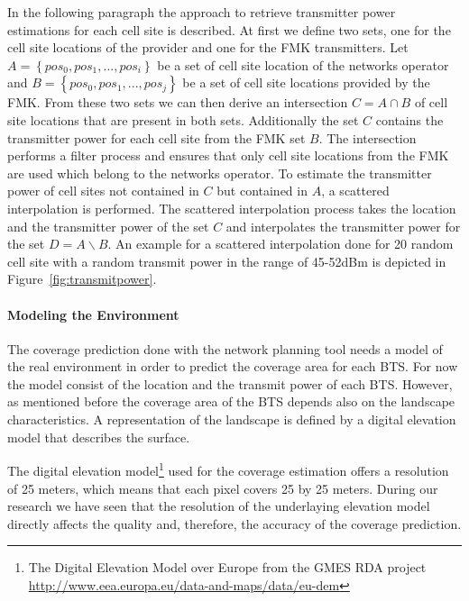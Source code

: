 \documentclass[twocolumn]{bmcart}%
\begin{document}
In the following paragraph the approach to retrieve transmitter power estimations for each cell site is described. At first we define two sets, one for the cell site locations of the provider and one for the FMK transmitters.
Let $A=\left\lbrace pos_0,pos_1,...,pos_i \right\rbrace $ be a set of cell site location of the networks operator and $B=\left\lbrace pos_0,pos_1,...,pos_j \right\rbrace$ be a set of cell site locations provided by the FMK. From these two sets we can then derive an intersection $C=A \cap B$ of cell site locations that are present in both sets. Additionally the set $C$ contains the transmitter power for each cell site from the FMK set $B$. The intersection performs a filter process and ensures that only cell site locations from the FMK are used which belong to the networks operator. To estimate the transmitter power of cell sites not contained in $C$ but  contained in $A$, a scattered interpolation is performed. The scattered interpolation process takes the location and the transmitter power of the set $C$ and interpolates the transmitter power for the set $D=A \backslash B$.
An example for a scattered interpolation done for 20 random cell site with a random transmit power in the range of 45-52dBm is depicted in Figure~\ref{fig:transmitpower}.

\paragraph{Modeling the Environment}
The coverage prediction done with the network planning tool needs a model of the real environment in order to predict the coverage area for each BTS. For now the model consist of the location and the transmit power of each BTS. However, as mentioned before the coverage area of the BTS depends also on the landscape characteristics. A representation of the landscape is defined by a digital elevation model that describes the surface. 

The digital elevation model\footnote{The Digital Elevation Model over Europe from the GMES RDA project \url{http://www.eea.europa.eu/data-and-maps/data/eu-dem}} used for the coverage estimation offers a resolution of 25 meters, which means that each pixel covers 25 by 25 meters. During our research we have seen that the resolution of the underlaying elevation model directly affects the quality and, therefore, the accuracy of the coverage prediction.
\end{document}
